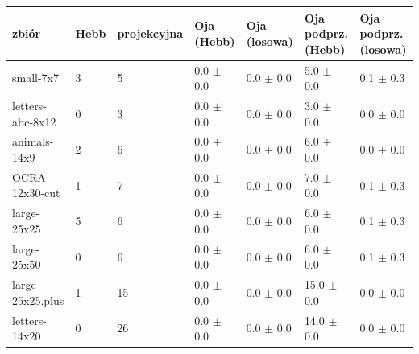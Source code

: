 \begin{tabular}{lllllll}
\toprule
zbiór & Hebb & projekcyjna & Oja (Hebb) & Oja (losowa) & Oja podprz. (Hebb) & Oja podprz. (losowa) \\
\midrule
small-7x7 & 3 & 5 & 0.0 $\pm$ 0.0 & 0.0 $\pm$ 0.0 & 5.0 $\pm$ 0.0 & 0.1 $\pm$ 0.3 \\
letters-abc-8x12 & 0 & 3 & 0.0 $\pm$ 0.0 & 0.0 $\pm$ 0.0 & 3.0 $\pm$ 0.0 & 0.0 $\pm$ 0.0 \\
animals-14x9 & 2 & 6 & 0.0 $\pm$ 0.0 & 0.0 $\pm$ 0.0 & 6.0 $\pm$ 0.0 & 0.0 $\pm$ 0.0 \\
OCRA-12x30-cut & 1 & 7 & 0.0 $\pm$ 0.0 & 0.0 $\pm$ 0.0 & 7.0 $\pm$ 0.0 & 0.1 $\pm$ 0.3 \\
large-25x25 & 5 & 6 & 0.0 $\pm$ 0.0 & 0.0 $\pm$ 0.0 & 6.0 $\pm$ 0.0 & 0.1 $\pm$ 0.3 \\
large-25x50 & 0 & 6 & 0.0 $\pm$ 0.0 & 0.0 $\pm$ 0.0 & 6.0 $\pm$ 0.0 & 0.1 $\pm$ 0.3 \\
large-25x25.plus & 1 & 15 & 0.0 $\pm$ 0.0 & 0.0 $\pm$ 0.0 & 15.0 $\pm$ 0.0 & 0.0 $\pm$ 0.0 \\
letters-14x20 & 0 & 26 & 0.0 $\pm$ 0.0 & 0.0 $\pm$ 0.0 & 14.0 $\pm$ 0.0 & 0.0 $\pm$ 0.0 \\
\bottomrule
\end{tabular}
